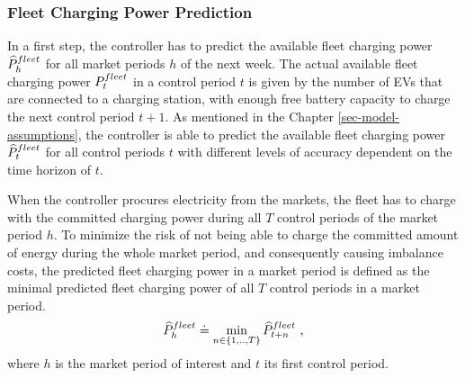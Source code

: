 \documentclass[a4paper, 12pt]{article}
\begin{document}
\subsubsection{Fleet Charging Power Prediction}
\label{sec:org5dbd178}
In a first step, the controller has to predict the available fleet charging
power \(\widehat{P}^{fleet}_{h}\) for all market periods \(h\) of the next week. The actual
available fleet charging power \(P^{fleet}_{t}\) in a control period \(t\) is given by the
number of EVs that are connected to a charging station, with enough free battery
capacity to charge the next control period \(t\!+\!1\). As mentioned in the
Chapter \ref{sec-model-assumptions}, the controller is able to predict the
available fleet charging power \(\widehat{P}^{fleet}_{t}\) for all control periods \(t\) with
different levels of accuracy dependent on the time horizon of \(t\).

When the controller procures electricity from the markets, the fleet has to
charge with the committed charging power during all \(T\) control periods of the
market period \(h\).
To minimize the risk of not being able to charge the committed amount of energy
during the whole market period, and consequently causing imbalance costs, the
predicted fleet charging power in a market period is defined as the minimal
predicted fleet charging power of all \(T\) control periods in a market period.
\begin{equation}
    \widehat{P}^{fleet}_{h} \doteq \min_{n \in \{1, .., T\}} \widehat{P}^{fleet}_{t + n} \text{ ,}
\end{equation}
where \(h\) is the market period of interest and \(t\) its first control period.
\end{document}

